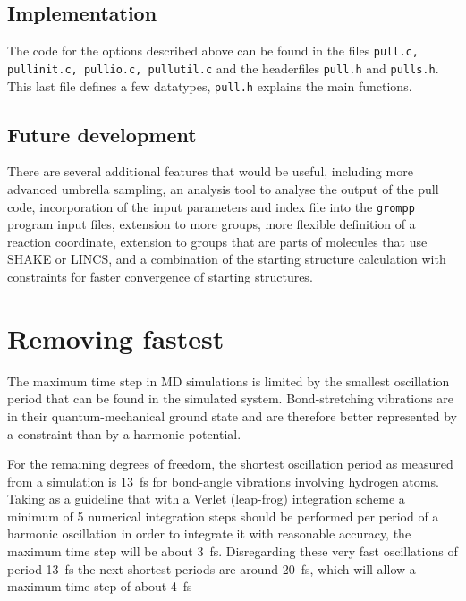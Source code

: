\subsection{Implementation}

The code for the options described above can be found in the files
{\tt pull.c, pullinit.c, pullio.c, pullutil.c} and the headerfiles
{\tt pull.h} and {\tt pulls.h}. This last file defines a few
datatypes, {\tt pull.h} explains the main functions. 

\subsection{Future development}
There are several additional features that would be useful, including
more advanced umbrella sampling, an analysis tool to analyse the
output of the pull code, incorporation of the input parameters and
index file into the {\tt grompp} program input files, extension to more
groups, more flexible definition of a reaction coordinate, extension
to groups that are parts of molecules that use SHAKE or LINCS, and a
combination of the starting structure calculation with constraints for
faster convergence of starting structures.


\newcommand{\amine}{\sf -NH$_2$}
\newcommand{\amines}{\sf -NH-}
\newcommand{\aminep}{\sf -NH$_3^+$}
\section{Removing fastest }
The maximum time step in MD simulations is limited by the smallest
oscillation period that can be found in the simulated
system. Bond-stretching vibrations are in their quantum-mechanical
ground state and are therefore better represented by a constraint than
by a harmonic potential.

For the remaining degrees of freedom, the shortest oscillation period
as measured from a simulation is 13~fs for bond-angle vibrations
involving hydrogen atoms. Taking as a guideline that with a Verlet
(leap-frog) integration scheme a minimum of 5 numerical integration
steps should be performed per period of a harmonic oscillation in
order to integrate it with reasonable accuracy, the maximum time step
will be about 3~fs. Disregarding these very fast oscillations of
period 13~fs the next shortest periods are around 20~fs, which will
allow a maximum time step of about 4~fs


